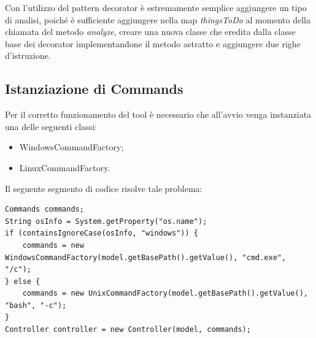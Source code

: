 Con l'utilizzo del pattern decorator \`{e} estremamente semplice aggiungere un tipo di analisi, poiché è sufficiente aggiungere nella map \textit{thingsToDo} al momento della chiamata del metodo \textit{analyze}, creare una nuova classe che eredita dalla classe base dei decorator implementandone il metodo astratto e aggiungere due righe d'istruzione.

\subsection{Istanziazione di Commands}\label{subsec:istanziazione-di-commands}
Per il corretto funzionamento del tool è necessario che all'avvio venga instanziata una delle seguenti classi:
\begin{itemize}
    \item WindowsCommandFactory;
    \item LinuxCommandFactory.
\end{itemize}
Il seguente segmento di codice risolve tale problema:

\begin{lstlisting}[caption={Creazione dell'istanza di Commands in base al S.O.},label={lst:commands}]
Commands commands;
String osInfo = System.getProperty("os.name");
if (containsIgnoreCase(osInfo, "windows")) {
    commands = new WindowsCommandFactory(model.getBasePath().getValue(), "cmd.exe", "/c");
} else {
    commands = new UnixCommandFactory(model.getBasePath().getValue(), "bash", "-c");
}
Controller controller = new Controller(model, commands);
\end{lstlisting}